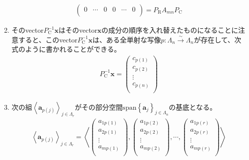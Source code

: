 \documentclass[dvipdfmx]{jsarticle}
\begin{document}
\begin{thm*}
\begin{enumerate}
\begin{align*}
\begin{pmatrix}
    0 & \cdots & 0 & 0 & \cdots & 0 \\
    \end{pmatrix} = P_{\mathrm{R}}A_{mn}P_{\mathrm{C}}
    \end{align*}
    \item
      そのvector$P_{\mathrm{C}}^{- 1}\mathbf{x}$はそのvector$\mathbf{x}$の成分の順序を入れ替えたものになることに注意すると、このvector$P_{\mathrm{C}}^{- 1}\mathbf{x}$は、ある全単射な写像$p:\varLambda_{n}\overset{\sim}{\rightarrow}\varLambda_{n}$が存在して、次式のように書かれることができる。
    \begin{align*}
    P_{\mathrm{C}}^{- 1}\mathbf{x} = \begin{pmatrix}
    c_{p(1)} \\
    c_{p(2)} \\
     \vdots \\
    c_{p(n)} \\
    \end{pmatrix}
    \end{align*}
    \item
      次の組$\left\langle \mathbf{a}_{p(j)} \right\rangle_{j \in \varLambda_{r}}$がその部分空間${\mathrm{span} }\left\{ \mathbf{a}_{j} \right\}_{j \in \varLambda_{n}}$の基底となる。
    \begin{align*}
    \left\langle \mathbf{a}_{p(j)} \right\rangle_{j \in \varLambda_{r}} = \left\langle \begin{pmatrix}
    a_{1p(1)} \\
    a_{2p(1)} \\
     \vdots \\
    a_{mp(1)} \\
    \end{pmatrix},\begin{pmatrix}
    a_{1p(2)} \\
    a_{2p(2)} \\
     \vdots \\
    a_{mp(2)} \\
    \end{pmatrix},\cdots,\begin{pmatrix}
    a_{1p(r)} \\
    a_{2p(r)} \\
     \vdots \\
    a_{mp(r)} \\
    \end{pmatrix} \right\rangle
    \end{align*}
    \end{enumerate}
\end{thm*}
\end{document}
